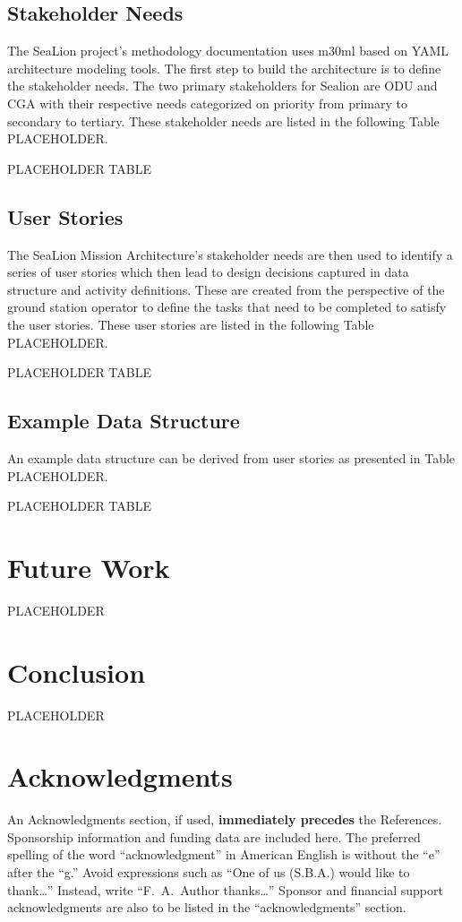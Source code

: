 \documentclass[conf]{new-aiaa}
\begin{document}
\subsection{Stakeholder Needs}

The SeaLion project's methodology documentation uses m30ml based on YAML architecture modeling tools. The first step to build the architecture is to define the stakeholder needs. The two primary stakeholders for Sealion are ODU and CGA with their respective needs categorized on priority from primary to secondary to tertiary. These stakeholder needs are listed in the following Table PLACEHOLDER.

PLACEHOLDER TABLE

\subsection{User Stories}

The SeaLion Mission Architecture's stakeholder needs are then used to identify a series of user stories which then lead to design decisions captured in data structure and activity definitions. These are created from the perspective of the ground station operator to define the tasks that need to be completed to satisfy the user stories. These user stories are listed in the following Table PLACEHOLDER.

PLACEHOLDER TABLE

\subsection{Example Data Structure}

An example data structure can be derived from user stories as presented in Table PLACEHOLDER.

PLACEHOLDER TABLE

\section{Future Work}

PLACEHOLDER

\section{Conclusion}

PLACEHOLDER

\section*{Acknowledgments}
An Acknowledgments section, if used, \textbf{immediately precedes} the References. Sponsorship information and funding data are included here. The preferred spelling of the word ``acknowledgment'' in American English is without the ``e'' after the ``g.'' Avoid expressions such as ``One of us (S.B.A.) would like to thank\ldots'' Instead, write ``F.~A.~Author thanks\ldots'' Sponsor and financial support acknowledgments are also to be listed in the ``acknowledgments'' section.


\end{document}
